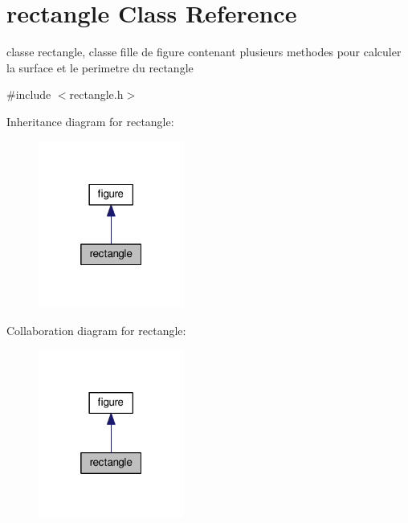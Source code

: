 \hypertarget{classrectangle}{}\section{rectangle Class Reference}
\label{classrectangle}


classe rectangle, classe fille de figure contenant plusieurs methodes pour calculer la surface et le perimetre du rectangle  




{\ttfamily \#include $<$rectangle.\+h$>$}



Inheritance diagram for rectangle\+:\nopagebreak
\begin{figure}[H]
\begin{center}
\leavevmode
\includegraphics[width=136pt]{classrectangle__inherit__graph}
\end{center}
\end{figure}


Collaboration diagram for rectangle\+:\nopagebreak
\begin{figure}[H]
\begin{center}
\leavevmode
\includegraphics[width=136pt]{classrectangle__coll__graph}
\end{center}
\end{figure}
